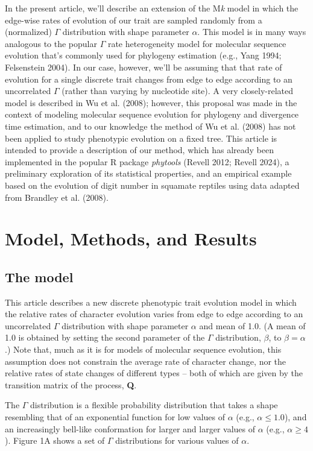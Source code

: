 \documentclass[fleqn,10pt,lineno]{wlpeerj} %
\begin{document}
In the present article, we'll describe an extension of the M\emph{k} model in which the edge-wise rates of evolution of our trait are sampled randomly from a (normalized) \(\Gamma\) distribution with shape parameter \(\alpha\). This model is in many ways analogous to the popular \(\Gamma\) rate heterogeneity model for molecular sequence evolution that's commonly used for phylogeny estimation (e.g., Yang 1994; Felsenstein 2004). In our case, however, we'll be assuming that that rate of evolution for a single discrete trait changes from edge to edge according to an uncorrelated \(\Gamma\) (rather than varying by nucleotide site). A very closely-related model is described in Wu et al. (2008); however, this proposal was made in the context of modeling molecular sequence evolution for phylogeny and divergence time estimation, and to our knowledge the method of Wu et al. (2008) has not been applied to study phenotypic evolution on a fixed tree. This article is intended to provide a description of our method, which has already been implemented in the popular R package \emph{phytools} (Revell 2012; Revell 2024), a preliminary exploration of its statistical properties, and an empirical example based on the evolution of digit number in squamate reptiles using data adapted from Brandley et al. (2008).

\section{Model, Methods, and Results}\label{model-methods-and-results}

\subsection{The model}\label{the-model}

This article describes a new discrete phenotypic trait evolution model in which the relative rates of character evolution varies from edge to edge according to an uncorrelated \(\Gamma\) distribution with shape parameter \(\alpha\) and mean of 1.0. (A mean of 1.0 is obtained by setting the second parameter of the \(\Gamma\) distribution, \(\beta\), to \(\beta = \alpha\).) Note that, much as it is for models of molecular sequence evolution, this assumption does not constrain the average rate of character change, nor the relative rates of state changes of different types -- both of which are given by the transition matrix of the process, \textbf{Q}.

The \(\Gamma\) distribution is a flexible probability distribution that takes a shape resembling that of an exponential function for low values of \(\alpha\) (e.g., \(\alpha \le 1.0\)), and an increasingly bell-like conformation for larger and larger values of \(\alpha\) (e.g., \(\alpha \ge 4\)). Figure 1A shows a set of \(\Gamma\) distributions for various values of \(\alpha\).
\end{document}
